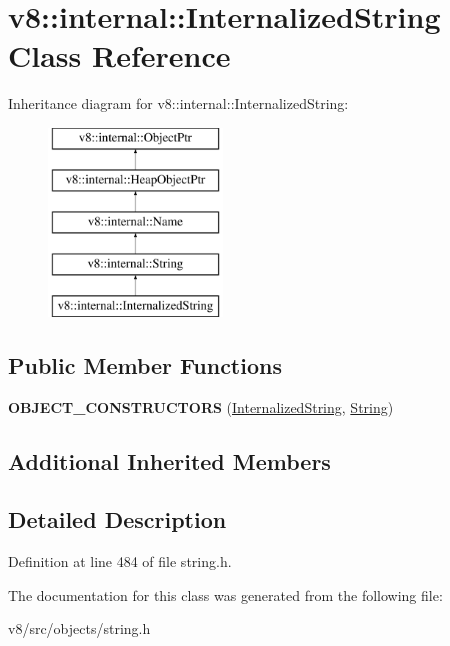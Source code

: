 \hypertarget{classv8_1_1internal_1_1InternalizedString}{}\section{v8\+:\+:internal\+:\+:Internalized\+String Class Reference}
\label{classv8_1_1internal_1_1InternalizedString}
Inheritance diagram for v8\+:\+:internal\+:\+:Internalized\+String\+:\begin{figure}[H]
\begin{center}
\leavevmode
\includegraphics[height=5.000000cm]{classv8_1_1internal_1_1InternalizedString}
\end{center}
\end{figure}
\subsection*{Public Member Functions}
\begin{DoxyCompactItemize}
\item 
\mbox{\label{classv8_1_1internal_1_1InternalizedString_a80f6db21a143be1a0e52ff0440a252c8}} 
{\bfseries O\+B\+J\+E\+C\+T\+\_\+\+C\+O\+N\+S\+T\+R\+U\+C\+T\+O\+RS} (\mbox{\hyperlink{classv8_1_1internal_1_1InternalizedString}{Internalized\+String}}, \mbox{\hyperlink{classv8_1_1internal_1_1String}{String}})
\end{DoxyCompactItemize}
\subsection*{Additional Inherited Members}


\subsection{Detailed Description}


Definition at line 484 of file string.\+h.



The documentation for this class was generated from the following file\+:\begin{DoxyCompactItemize}
\item 
v8/src/objects/string.\+h\end{DoxyCompactItemize}

